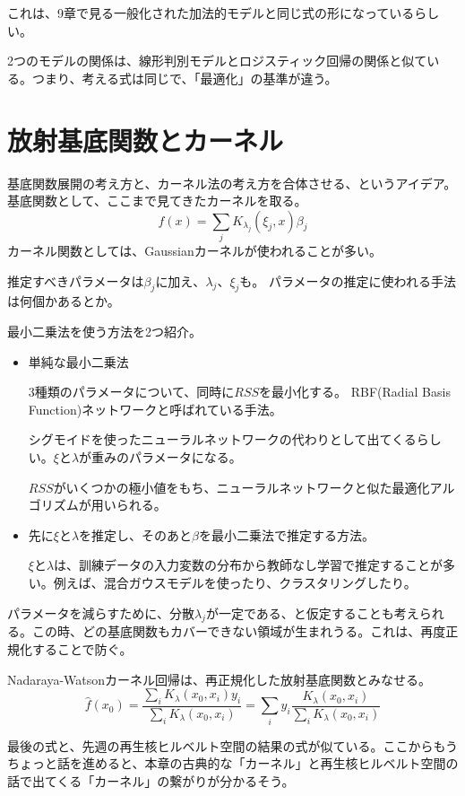 \documentclass[uplatex]{jsarticle}
\begin{document}
これは、9章で見る一般化された加法的モデルと同じ式の形になっているらしい。

2つのモデルの関係は、線形判別モデルとロジスティック回帰の関係と似ている。つまり、考える式は同じで、「最適化」の基準が違う。

\section{放射基底関数とカーネル}
基底関数展開の考え方と、カーネル法の考え方を合体させる、というアイデア。基底関数として、ここまで見てきたカーネルを取る。
\[
  f(x)=\sum_{j}K_{\lambda_{j}}(\xi_{j},x)\beta_{j}
\]
カーネル関数としては、Gaussianカーネルが使われることが多い。

推定すべきパラメータは$\beta_{j}$に加え、$\lambda_{j}$、$\xi_{j}$も。
パラメータの推定に使われる手法は何個かあるとか。

最小二乗法を使う方法を2つ紹介。
\begin{itemize}
  \item 単純な最小二乗法

  3種類のパラメータについて、同時に$RSS$を最小化する。
  RBF(Radial Basis Function)ネットワークと呼ばれている手法。

  シグモイドを使ったニューラルネットワークの代わりとして出てくるらしい。$\xi$と$\lambda$が重みのパラメータになる。

  $RSS$がいくつかの極小値をもち、ニューラルネットワークと似た最適化アルゴリズムが用いられる。

  \item 先に$\xi$と$\lambda$を推定し、そのあと$\beta$を最小二乗法で推定する方法。

  $\xi$と$\lambda$は、訓練データの入力変数の分布から教師なし学習で推定することが多い。例えば、混合ガウスモデルを使ったり、クラスタリングしたり。
\end{itemize}

パラメータを減らすために、分散$\lambda_j$が一定である、と仮定することも考えられる。この時、どの基底関数もカバーできない領域が生まれうる。これは、再度正規化することで防ぐ。

Nadaraya-Watsonカーネル回帰は、再正規化した放射基底関数とみなせる。
\[
  \hat{f}(x_{0})=\frac{\sum_{i}K_{\lambda}(x_{0},x_{i})y_{i}}{\sum_{i}K_{\lambda}(x_{0},x_{i})}=\sum_{i}y_{i}\frac{K_{\lambda}(x_{0},x_{i})}{\sum_{i}K_{\lambda}(x_{0},x_{i})}
\]

最後の式と、先週の再生核ヒルベルト空間の結果の式が似ている。ここからもうちょっと話を進めると、本章の古典的な「カーネル」と再生核ヒルベルト空間の話で出てくる「カーネル」の繋がりが分かるそう。
\end{document}
